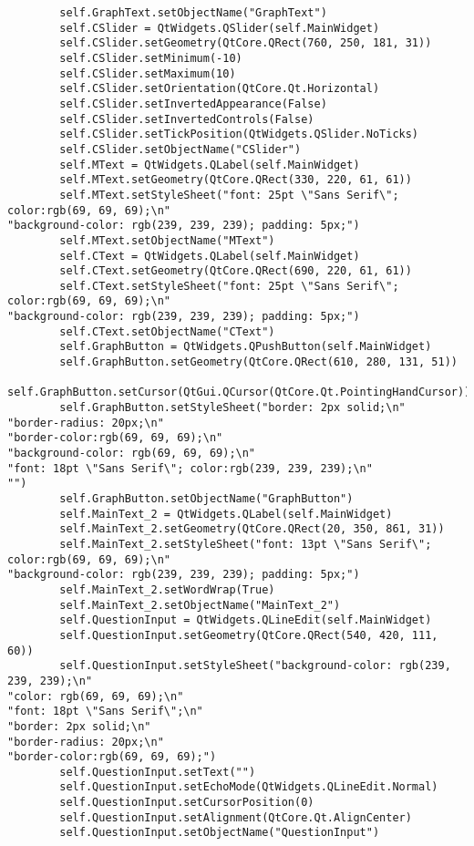 \documentclass{article}
\begin{document}
\begin{lstlisting}
        self.GraphText.setObjectName("GraphText")
        self.CSlider = QtWidgets.QSlider(self.MainWidget)
        self.CSlider.setGeometry(QtCore.QRect(760, 250, 181, 31))
        self.CSlider.setMinimum(-10)
        self.CSlider.setMaximum(10)
        self.CSlider.setOrientation(QtCore.Qt.Horizontal)
        self.CSlider.setInvertedAppearance(False)
        self.CSlider.setInvertedControls(False)
        self.CSlider.setTickPosition(QtWidgets.QSlider.NoTicks)
        self.CSlider.setObjectName("CSlider")
        self.MText = QtWidgets.QLabel(self.MainWidget)
        self.MText.setGeometry(QtCore.QRect(330, 220, 61, 61))
        self.MText.setStyleSheet("font: 25pt \"Sans Serif\"; color:rgb(69, 69, 69);\n"
"background-color: rgb(239, 239, 239); padding: 5px;")
        self.MText.setObjectName("MText")
        self.CText = QtWidgets.QLabel(self.MainWidget)
        self.CText.setGeometry(QtCore.QRect(690, 220, 61, 61))
        self.CText.setStyleSheet("font: 25pt \"Sans Serif\"; color:rgb(69, 69, 69);\n"
"background-color: rgb(239, 239, 239); padding: 5px;")
        self.CText.setObjectName("CText")
        self.GraphButton = QtWidgets.QPushButton(self.MainWidget)
        self.GraphButton.setGeometry(QtCore.QRect(610, 280, 131, 51))
        self.GraphButton.setCursor(QtGui.QCursor(QtCore.Qt.PointingHandCursor))
        self.GraphButton.setStyleSheet("border: 2px solid;\n"
"border-radius: 20px;\n"
"border-color:rgb(69, 69, 69);\n"
"background-color: rgb(69, 69, 69);\n"
"font: 18pt \"Sans Serif\"; color:rgb(239, 239, 239);\n"
"")
        self.GraphButton.setObjectName("GraphButton")
        self.MainText_2 = QtWidgets.QLabel(self.MainWidget)
        self.MainText_2.setGeometry(QtCore.QRect(20, 350, 861, 31))
        self.MainText_2.setStyleSheet("font: 13pt \"Sans Serif\"; color:rgb(69, 69, 69);\n"
"background-color: rgb(239, 239, 239); padding: 5px;")
        self.MainText_2.setWordWrap(True)
        self.MainText_2.setObjectName("MainText_2")
        self.QuestionInput = QtWidgets.QLineEdit(self.MainWidget)
        self.QuestionInput.setGeometry(QtCore.QRect(540, 420, 111, 60))
        self.QuestionInput.setStyleSheet("background-color: rgb(239, 239, 239);\n"
"color: rgb(69, 69, 69);\n"
"font: 18pt \"Sans Serif\";\n"
"border: 2px solid;\n"
"border-radius: 20px;\n"
"border-color:rgb(69, 69, 69);")
        self.QuestionInput.setText("")
        self.QuestionInput.setEchoMode(QtWidgets.QLineEdit.Normal)
        self.QuestionInput.setCursorPosition(0)
        self.QuestionInput.setAlignment(QtCore.Qt.AlignCenter)
        self.QuestionInput.setObjectName("QuestionInput")

\end{lstlisting}
\end{document}
